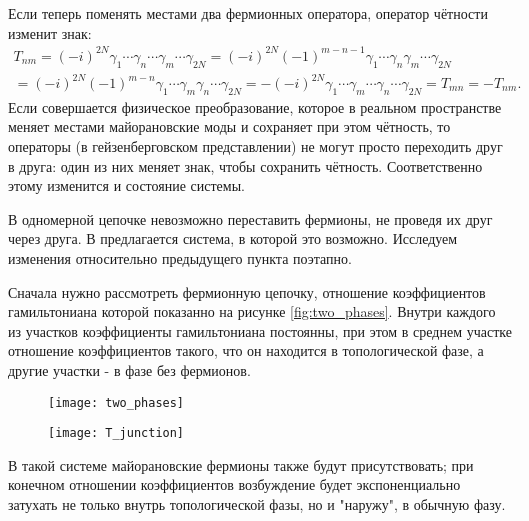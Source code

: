 \documentclass[a4paper,12pt]{article}
\theoremstyle{plain} %
\theoremstyle{definition} %
\theoremstyle{remark} %
\begin{document}
Если теперь поменять местами два фермионных оператора, оператор чётности изменит знак:
\begin{multline}
T_{nm} = (-i)^{2N} \gamma_1 \dotsm \gamma_n \dotsm \gamma_m \dotsm \gamma_{2N} = 
    (-i)^{2N} (-1)^{m-n-1} \gamma_1 \dotsm \gamma_n \gamma_m \dotsm \gamma_{2N} \\ =
    (-i)^{2N} (-1)^{m-n} \gamma_1 \dotsm \gamma_m \gamma_n \dotsm \gamma_{2N} = 
     - (-i)^{2N} \gamma_1 \dotsm \gamma_m \dotsm \gamma_n \dotsm \gamma_{2N} = 
     T_{mn} = - T_{nm}.
\end{multline}
Если совершается физическое преобразование, которое в реальном пространстве меняет местами майорановские моды и сохраняет при этом чётность, то операторы (в гейзенберговском представлении) не могут просто переходить друг в друга: один из них меняет знак, чтобы сохранить чётность. Соответственно этому изменится и состояние системы.

В одномерной цепочке невозможно переставить фермионы, не проведя их друг через друга. В \cite{braiding} предлагается система, в которой это возможно. Исследуем изменения относительно предыдущего пункта поэтапно.

Сначала нужно рассмотреть фермионную цепочку, отношение коэффициентов гамильтониана которой показанно на рисунке \ref{fig:two_phases}. Внутри каждого из участков коэффициенты гамильтониана постоянны, при этом в среднем участке отношение коэффициентов такого, что он находится в топологической фазе, а другие участки - в фазе без фермионов.

\begin{figure}
    \centering
    \begin{minipage}{.5\textwidth}
        \centering
        \texttt{[image: two\_phases]}
        \captionsetup{width=0.9\textwidth}
        \label{fig:two_phases}
    \end{minipage}%
    \begin{minipage}{.5\textwidth}
        \centering
        \texttt{[image: T\_junction]}
        \captionsetup{width=0.9\textwidth}
        \label{fig:t_junction}
    \end{minipage}
\end{figure}

В такой системе майорановские фермионы также будут присутствовать; при конечном отношении коэффициентов возбуждение будет экспоненциально затухать не только внутрь топологической фазы, но и "наружу"$ $, в обычную фазу.
\end{document}
